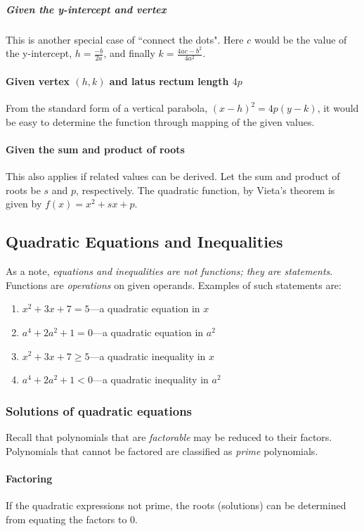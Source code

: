 \subparagraph{Given the y-intercept and vertex}
This is another special case of ``connect the dots".
Here $c$ would be the value of the y-intercept, $h = \frac{-b}{2a}$, and finally $k = \frac{4ac-b^2}{4a^2}$.

\paragraph{Given vertex $(h, k)$ and latus rectum length $4p$}
From the standard form of a vertical parabola, $(x-h)^2 = 4p(y-k)$, it would be easy to determine the function through mapping of the given values.

\paragraph{Given the sum and product of roots}
This also applies if related values can be derived.
Let the sum and product of roots be $s$ and $p$, respectively.
The quadratic function, by Vieta's theorem is given by $f(x) = x^2 + sx + p$.

\subsection{Quadratic Equations and Inequalities}
As a note, \emph{equations and inequalities are not functions; they are statements}.
Functions are \emph{operations} on given operands.
Examples of such statements are:
\begin{enumerate}
    \item $x^2 + 3x + 7 = 5$---a quadratic equation in $x$
    \item $a^4 + 2a^2 + 1 = 0$---a quadratic equation in $a^2$
    \item $x^2 + 3x + 7 \geq 5$---a quadratic inequality in $x$
    \item $a^4 + 2a^2 + 1 < 0$---a quadratic inequality in $a^2$
\end{enumerate}

\subsubsection{Solutions of quadratic equations}
Recall that polynomials that are \emph{factorable} may be reduced to their factors.
Polynomials that cannot be factored are classified as \emph{prime} polynomials.

\paragraph{Factoring}
If the quadratic expressions not prime, the roots (solutions) can be determined from equating the factors to $0$.

